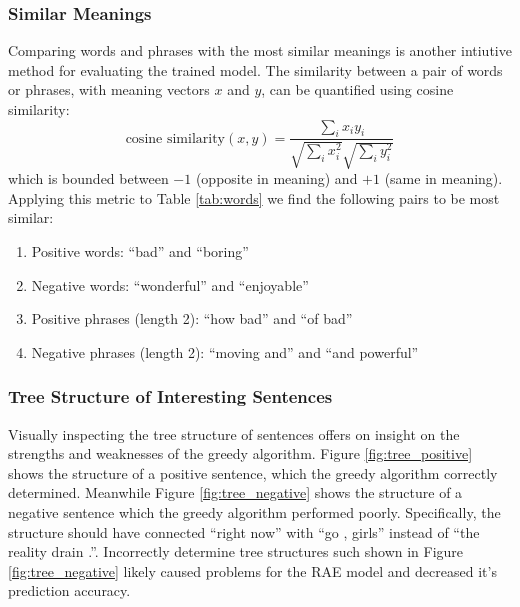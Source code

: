 \documentclass{article}
\begin{document}
\subsubsection{Similar Meanings}
Comparing words and phrases with the most similar meanings is another intiutive method for evaluating the trained model. The similarity between a pair of words or phrases, with meaning vectors $x$ and $y$, can be quantified using cosine similarity:
\begin{equation}
    \textrm{cosine similarity} (x, y) = \frac{\sum_i x_i y_i}{\sqrt{\sum_i x_i^2} \sqrt{\sum_i y_i^2}}
\end{equation}
which is bounded between $-1$ (opposite in meaning) and $+1$ (same in meaning). Applying this metric to Table \ref{tab:words} we find the following pairs to be most similar:
\begin{enumerate}
    \item Positive words: ``bad'' and ``boring''
    \item Negative words: ``wonderful'' and ``enjoyable''
    \item Positive phrases (length 2): ``how bad'' and ``of bad''
    \item Negative phrases (length 2): ``moving and'' and ``and powerful''
\end{enumerate}


\subsubsection{Tree Structure of Interesting Sentences}
Visually inspecting the tree structure of sentences offers on insight on the strengths and weaknesses of the greedy algorithm. Figure \ref{fig:tree_positive} shows the structure of a positive sentence, which the greedy algorithm correctly determined. Meanwhile Figure \ref{fig:tree_negative} shows the structure of a negative sentence which the greedy algorithm performed poorly. Specifically, the structure should have connected ``right now'' with ``go , girls'' instead of ``the reality drain .''. Incorrectly determine tree structures such shown in Figure \ref{fig:tree_negative} likely caused problems for the RAE model and decreased it's prediction accuracy.
\end{document}
